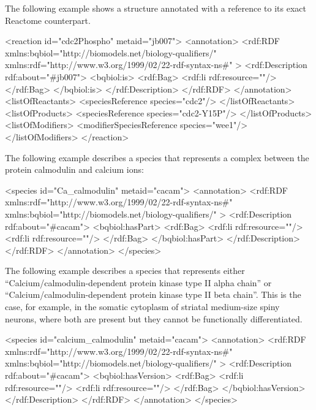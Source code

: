 The following example shows a \Reaction structure annotated
with a reference to its exact Reactome counterpart.

\begin{example}
<reaction id="cdc2Phospho" metaid="jb007">
  <annotation>
    <rdf:RDF
      xmlns:bqbiol="http://biomodels.net/biology-qualifiers/"
      xmlns:rdf="http://www.w3.org/1999/02/22-rdf-syntax-ns\#"
    >
      <rdf:Description rdf:about="#jb007">
        <bqbiol:is>
          <rdf:Bag>
            <rdf:li rdf:resource="\!"/>
          </rdf:Bag>
        </bqbiol:is>
      </rdf:Description>
    </rdf:RDF>
  </annotation>
  <listOfReactants>
    <speciesReference species="cdc2"/>
  </listOfReactants>
  <listOfProducts>
    <speciesReference species="cdc2-Y15P"/>
  </listOfProducts>
  <listOfModifiers>
    <modifierSpeciesReference species="wee1"/>
  </listOfModifiers>
</reaction>
\end{example}

The following example describes a species that represents a
complex between the protein calmodulin and calcium ions:

\begin{example}
<species id="Ca_calmodulin" metaid="cacam">
  <annotation>
    <rdf:RDF
      xmlns:rdf="http://www.w3.org/1999/02/22-rdf-syntax-ns\#"
      xmlns:bqbiol="http://biomodels.net/biology-qualifiers/"
    >
      <rdf:Description rdf:about="\#cacam">
        <bqbiol:hasPart>
          <rdf:Bag>
            <rdf:li rdf:resource="\!"/>
            <rdf:li rdf:resource="\!"/>
          </rdf:Bag>
        </bqbiol:hasPart>
      </rdf:Description>
    </rdf:RDF>
  </annotation>
</species>
\end{example}

The following example describes a species that represents either
``Calcium/calmodulin-dependent protein kinase type II alpha
chain'' or ``Calcium/calmodulin-dependent protein kinase type II
beta chain''. This is the case, for example, in the somatic
cytoplasm of striatal medium-size spiny neurons, where both are
present but they cannot be functionally differentiated.

\begin{example}
<species id="calcium_calmodulin" metaid="cacam">
  <annotation>
    <rdf:RDF
      xmlns:rdf="http://www.w3.org/1999/02/22-rdf-syntax-ns\#"
      xmlns:bqbiol="http://biomodels.net/biology-qualifiers/"
    >
      <rdf:Description rdf:about="\#cacam">
        <bqbiol:hasVersion>
          <rdf:Bag>
            <rdf:li rdf:resource="\!"/>
            <rdf:li rdf:resource="\!"/>
          </rdf:Bag>
        </bqbiol:hasVersion>
      </rdf:Description>
    </rdf:RDF>
  </annotation>
</species>
\end{example}

